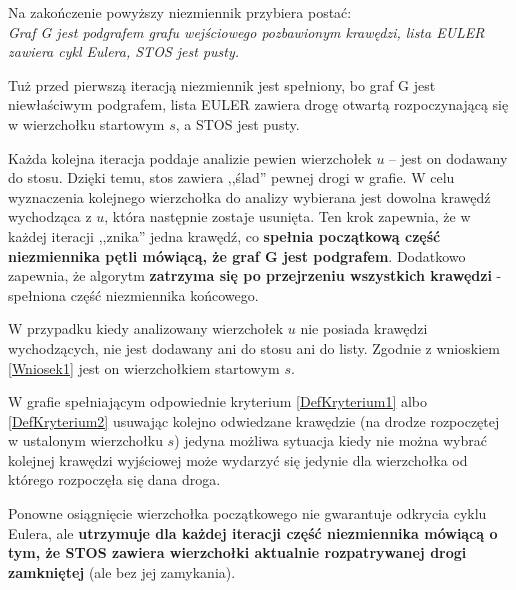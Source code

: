Na zakończenie powyższy niezmiennik przybiera postać: \\
\textit{Graf G jest podgrafem grafu wejściowego pozbawionym krawędzi, lista EULER zawiera cykl Eulera, STOS jest pusty.}

Tuż przed pierwszą iteracją niezmiennik jest spełniony, bo graf G jest niewłaściwym podgrafem, lista EULER zawiera drogę otwartą rozpoczynającą się w wierzchołku startowym $s$, a STOS jest pusty.

Każda kolejna iteracja poddaje analizie pewien wierzchołek $u$ -- jest on dodawany do stosu.
Dzięki temu, stos zawiera ,,ślad'' pewnej drogi w grafie. 
W celu wyznaczenia kolejnego wierzchołka do analizy wybierana jest dowolna krawędź wychodząca z $u$, która następnie zostaje usunięta.
Ten krok zapewnia, że w każdej iteracji ,,znika'' jedna krawędź, co \textbf{spełnia początkową część niezmiennika pętli mówiącą, że graf G jest podgrafem}. Dodatkowo zapewnia, że algorytm \textbf{zatrzyma się po przejrzeniu wszystkich krawędzi} - spełniona część niezmiennika końcowego.

W przypadku kiedy analizowany wierzchołek $u$ nie posiada krawędzi wychodzących, nie jest dodawany ani do stosu ani do listy. Zgodnie z wnioskiem \ref{Wniosek1} jest on wierzchołkiem startowym $s$.
\begin{concl}
\label{Wniosek1}
W grafie spełniającym odpowiednie kryterium \ref{DefKryterium1} albo \ref{DefKryterium2} usuwając kolejno odwiedzane krawędzie (na drodze rozpoczętej w ustalonym wierzchołku $s$) jedyna możliwa sytuacja kiedy nie można wybrać kolejnej krawędzi wyjściowej może wydarzyć się jedynie dla wierzchołka od którego rozpoczęła się dana droga.
\end{concl}

Ponowne osiągnięcie wierzchołka początkowego nie gwarantuje odkrycia cyklu Eulera, ale \textbf{utrzymuje dla każdej iteracji część niezmiennika mówiącą o tym, że STOS zawiera wierzchołki aktualnie rozpatrywanej drogi zamkniętej} (ale bez jej zamykania).

